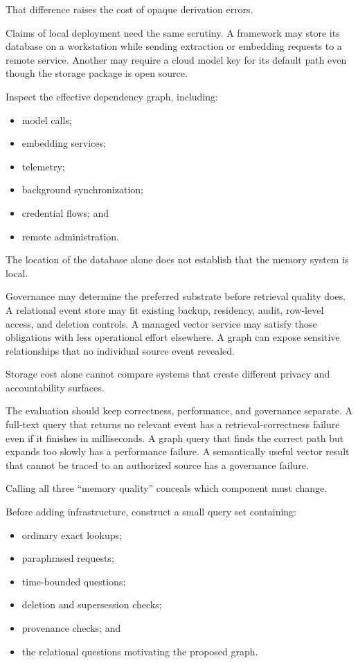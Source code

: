 That difference raises the cost of opaque derivation errors.

Claims of local deployment need the same scrutiny. A framework may store its database on a workstation while sending extraction or embedding requests to a remote service. Another may require a cloud model key for its default path even though the storage package is open source.


Inspect the effective dependency graph, including:

\begin{itemize}
\tightlist
\item
  model calls;
\item
  embedding services;
\item
  telemetry;
\item
  background synchronization;
\item
  credential flows; and
\item
  remote administration.
\end{itemize}

The location of the database alone does not establish that the memory system is local.

Governance may determine the preferred substrate before retrieval quality does. A relational event store may fit existing backup, residency, audit, row-level access, and deletion controls. A managed vector service may satisfy those obligations with less operational effort elsewhere. A graph can expose sensitive relationships that no individual source event revealed.

Storage cost alone cannot compare systems that create different privacy and accountability surfaces.

The evaluation should keep correctness, performance, and governance separate. A full-text query that returns no relevant event has a retrieval-correctness failure even if it finishes in milliseconds. A graph query that finds the correct path but expands too slowly has a performance failure. A semantically useful vector result that cannot be traced to an authorized source has a governance failure.

Calling all three ``memory quality'' conceals which component must change.


Before adding infrastructure, construct a small query set containing:

\begin{itemize}
\tightlist
\item
  ordinary exact lookups;
\item
  paraphrased requests;
\item
  time-bounded questions;
\item
  deletion and supersession checks;
\item
  provenance checks; and
\item
  the relational questions motivating the proposed graph.
\end{itemize}

